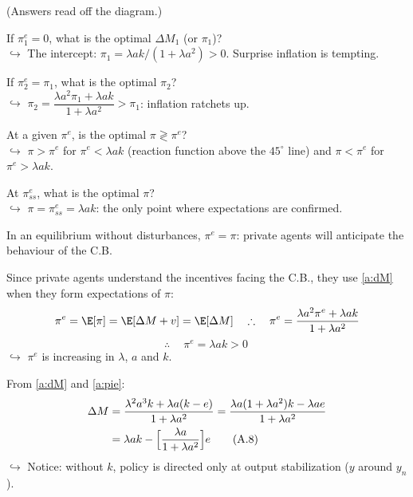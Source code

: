 \documentclass[11pt]{article}
\begin{document}
 (Answers read off the diagram.)
\begin{flatnum}
  \item If $\pi^e_1=0$, what is the optimal $\Delta M_1$ (or $\pi_1$)?\\
        $\hookrightarrow$ The intercept: $\pi_1=\lambda ak/(1+\lambda a^2)>0$. Surprise
        inflation is tempting.
  \item If $\pi^e_2=\pi_1$, what is the optimal $\pi_2$?\\
        $\hookrightarrow$ $\pi_2=\dfrac{\lambda a^2\pi_1+\lambda ak}{1+\lambda a^2}>\pi_1$:
        inflation ratchets up.
  \item At a given $\pi^e$, is the optimal $\pi\gtrless\pi^e$?\\
        $\hookrightarrow$ $\pi>\pi^e$ for $\pi^e<\lambda ak$ (reaction function above the
        $45^\circ$ line) and $\pi<\pi^e$ for $\pi^e>\lambda ak$.
  \item At $\pi^e_{ss}$, what is the optimal $\pi$?\\
        $\hookrightarrow$ $\pi=\pi^e_{ss}=\lambda ak$: the only point where expectations
        are confirmed.
\end{flatnum}

 In an equilibrium without disturbances,
$\pi^e=\pi$: private agents will anticipate the behaviour of the C.B.

Since private agents understand the incentives facing the C.B., they use \eqref{a:dM}
when they form expectations of $\pi$:
\[
  \pi^e=\E[\pi]=\E[\Delta M+v]=\E[\Delta M]
  \quad\therefore\quad
  \pi^e=\frac{\lambda a^2\pi^e+\lambda ak}{1+\lambda a^2}
\]
\begin{equation}
  \therefore\quad \boxed{\ \pi^e=\lambda ak>0\ } \tag{A.7}\label{a:pie}
\end{equation}
$\hookrightarrow$ $\pi^e$ is increasing in $\lambda$, $a$ and $k$.

From \eqref{a:dM} and \eqref{a:pie}:
\begin{align}
  \Delta M &= \frac{\lambda^2a^3k+\lambda a(k-e)}{1+\lambda a^2}
            = \frac{\lambda a(1+\lambda a^2)k-\lambda ae}{1+\lambda a^2}\notag\\
           &= \lambda ak-\Bigl[\frac{\lambda a}{1+\lambda a^2}\Bigr]e \tag{A.8}\label{a:dMeq}
\end{align}
$\hookrightarrow$ Notice: without $k$, policy is directed only at output stabilization
($y$ around $y_n$).
\end{document}
